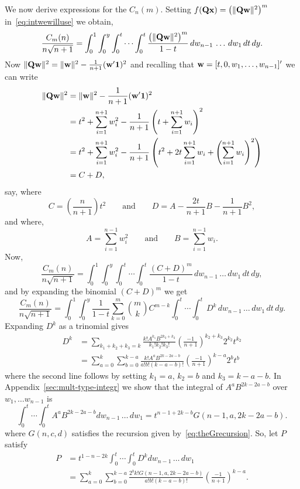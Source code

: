 \documentclass[draftcls, onecolumn, 11pt]{IEEEtran}
\begin{document}
We now derive expressions for the $C_n(m)$.  Setting $f(\mathbf{Q}\mathbf{x}) = \left(\|\mathbf{Q}\mathbf{w}\|^{2}\right)^m$ in~\eqref{eq:intwewilluse} we obtain,
\[
\frac{C_m(n)}{n\sqrt{n+1}} = \int_0^1 \int_0^y \int_0^t \cdots \int_0^t \frac{\left(\|\mathbf{Q}\mathbf{w}\|^2\right)^m}{1 - t} \,dw_{n-1} \, \dots \, dw_1 \, dt \, dy.
\]
Now $\|\mathbf{Q}\mathbf{w}\|^2 = \|\mathbf{w}\|^2 - \frac{1}{n+1}(\mathbf{w}^\prime \boldsymbol{1})^2$ and recalling that $\mathbf{w} = [t,0,w_1,\dots,w_{n-1}]'$ we can write
\begin{align*}
\|\mathbf{Q}\mathbf{w}\|^2 &= \|\mathbf{w}\|^2 - \frac{1}{n+1}(\mathbf{w}^\prime \boldsymbol{1})^2 \\
&= t^2 + \sum_{i=1}^{n+1}w_i^2 - \frac{1}{n+1}\left( t + \sum_{i=1}^{n+1}w_i \right)^2 \\
&= t^2 + \sum_{i=1}^{n+1}w_i^2 - \frac{1}{n+1}\left( t^2 + 2 t \sum_{i=1}^{n+1}w_i + \left(\sum_{i=1}^{n+1}w_i \right)^2 \right)\\
&= C + D,
\end{align*}
say, where
\[
C = \left(\frac{n}{n+1} \right) t^2 \qquad \text{and} \qquad D = A - \frac{2t}{n+1}B - \frac{1}{n+1}B^2,
\]
and where,
\[
 A = \sum_{i=1}^{n-1}w_i^2 \qquad \text{and} \qquad B = \sum_{i=1}^{n-1}w_i.
\]
Now,
\[
 \frac{C_m(n)}{n\sqrt{n+1}} =  \int_0^1 \int_0^y \int_0^t \cdots \int_0^t \frac{(C+D)^m}{1 - t} \,dw_{n-1} \, \dots \, dw_1 \, dt \, dy,
\]
and by expanding the binomial $(C+D)^m$ we get
\[
\frac{C_m(n)}{n\sqrt{n+1}} =  \int_0^1 \int_0^y \frac{1}{1 - t}\sum_{k=0}^{m}\binom{m}{k} C^{m-k} \int_0^t \cdots \int_0^t \, D^{k} \,dw_{n-1} \, \dots \, dw_1 \, dt \, dy.
\]
Expanding $D^k$ as a trinomial gives
\begin{align*}
D^k &= \sum_{k_1+k_2+k_3=k} \frac{k! A^{k_1} B^{2k_3 + k_2}}{k_1! k_2! k_3!} \left(\frac{-1}{n+1}\right)^{k_2+k_3}2^{k_2}t^{k_2}  \\
&=  \sum_{a=0}^k\sum_{b=0}^{k-a} \frac{k!  A^{a} B^{2k - 2a - b}}{a! b! (k-a-b)!} \left(\frac{-1}{n+1}\right)^{k - a}2^{b}t^{b}
\end{align*}
where the second line follows by setting $k_1 = a$, $k_2 = b$ and $k_3 = k - a - b$.  In Appendix~\ref{sec:mult-type-integr} we show that the integral of $A^{a} B^{2k - 2a - b}$ over $w_1,\dots w_{n-1}$ is
\[
\int_0^t \cdots \int_0^t A^{a} B^{2k-2a-b} dw_{n-1} \, \dots \, dw_1 = t^{n-1+2k - b} G(n-1,a,2k - 2a - b).
\]
where $G(n,c,d)$ satisfies the recursion given by~\eqref{eq:theGrecursion}.  So, let $P$ satisfy
\begin{align*}
P &= t^{1 - n - 2k}\int_0^t \cdots \int_0^t D^k dw_{n-1} \, \dots \, dw_1 \\
&= \sum_{a=0}^k\sum_{b=0}^{k-a} \frac{2^{b} k!G(n-1,a,2k - 2a - b)}{a! b! (k-a-b)!} \left(\frac{-1}{n+1}\right)^{k - a}.
\end{align*}
\end{document}
